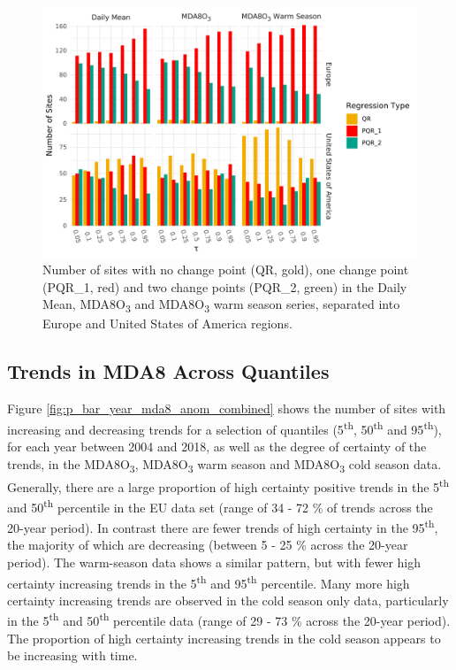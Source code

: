 \documentclass[journal abbreviation, manuscript]{copernicus}
\begin{document}
\begin{figure}[h!]
\includegraphics[width=12cm]{figures/paper_figures/regression_type_bars_o3.pdf}
\caption{Number of sites with no change point (QR, gold), one change point (PQR\_1, red) and two change points (PQR\_2, green) in the Daily Mean, MDA8O\textsubscript{3} and MDA8O\textsubscript{3} warm season series, separated into Europe and United States of America regions.}
\label{fig:regression_type}
\end{figure}




\subsection{Trends in MDA8 Across Quantiles} \label{sect:new_mda8_trends}

Figure \ref{fig:p_bar_year_mda8_anom_combined} shows the number of sites with increasing and decreasing trends for a selection of quantiles (5\textsuperscript{th}, 50\textsuperscript{th} and 95\textsuperscript{th}), for each year between 2004 and 2018, as well as the degree of certainty of the trends, in the MDA8O\textsubscript{3}, MDA8O\textsubscript{3} warm season and MDA8O\textsubscript{3} cold season data.
Generally, there are a large proportion of high certainty positive trends in the 5\textsuperscript{th} and 50\textsuperscript{th} percentile in the EU data set (range of 34 - 72 \% of trends across the 20-year period). In contrast there are fewer trends of high certainty in the 95\textsuperscript{th}, the majority of which are decreasing (between 5 - 25 \% across the 20-year period). The warm-season data shows a similar pattern, but with fewer high certainty increasing trends in the 5\textsuperscript{th} and 95\textsuperscript{th} percentile. Many more high certainty increasing trends are observed in the cold season only data, particularly in the 5\textsuperscript{th} and 50\textsuperscript{th} percentile data (range of 29 - 73 \% across the 20-year period). The proportion of high certainty increasing trends in the cold season appears to be increasing with time.
\end{document}

